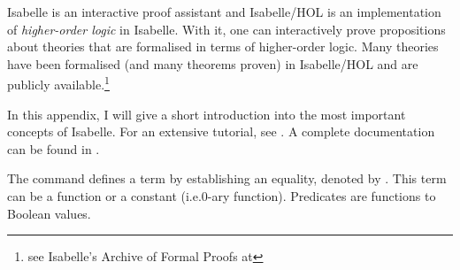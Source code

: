 %
\begin{isabellebody}%
%
%
\isadelimtheory
%
\endisadelimtheory
%
\isatagtheory
%
\endisatagtheory
{\isafoldtheory}%
%
\isadelimtheory
%
\endisadelimtheory
%
\isadelimdocument
%
\endisadelimdocument
%
\isatagdocument
%
\isamarkuptrue%
%
\endisatagdocument
{\isafolddocument}%
%
\isadelimdocument
%
\endisadelimdocument
%
\begin{isamarkuptext}%
\label{chap:isabelle}%
\end{isamarkuptext}\isamarkuptrue%
%
\begin{isamarkuptext}%
Isabelle is an interactive proof assistant and Isabelle/HOL is an implementation of \emph{higher-order logic} in Isabelle. With it, one can interactively prove propositions about theories that are formalised in terms of higher-order \linebreak logic. Many theories have been formalised (and many theorems proven) in Isabelle/HOL and are publicly available.\footnote{see Isabelle's Archive of Formal Proofs at }

In this appendix, I will give a short introduction into the most important concepts of Isabelle. For an extensive tutorial, see \cite{prog_prove}. A complete documentation can be found in \cite{isar_ref}.
\vspace{-.3cm}%
\end{isamarkuptext}\isamarkuptrue%
%
\isadelimdocument
%
\endisadelimdocument
%
\isatagdocument
%
\isamarkuptrue%
%
\endisatagdocument
{\isafolddocument}%
%
\isadelimdocument
%
\endisadelimdocument
%
\begin{isamarkuptext}%
The command  defines a term by establishing an equality, denoted by \isa{{\isasymequiv}}. This term can be a function or a constant (i.e.\@ 0-ary function). Predicates are functions to Boolean values.


\end{isamarkuptext}
\end{isabellebody}
